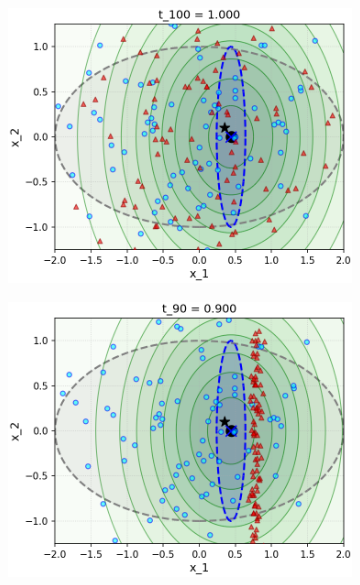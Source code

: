 \documentclass[../../book-main.tex]{subfiles}
\begin{document}
\begin{example}
\begin{figure}[tbp]
    \begin{subfigure}{0.32\textwidth}
      \includegraphics[width=\linewidth]{figs_chap5/samples_step_000_t_100_smallnoise.png}
    \end{subfigure}
    \hfill
    \begin{subfigure}{0.32\textwidth}
      \includegraphics[width=\linewidth]{figs_chap5/samples_step_010_t_90_smallnoise.png}
    \end{subfigure}
    \hfill
    \begin{subfigure}{0.32\textwidth}

\end{subfigure}
\end{figure}
\end{example}
\end{document}

